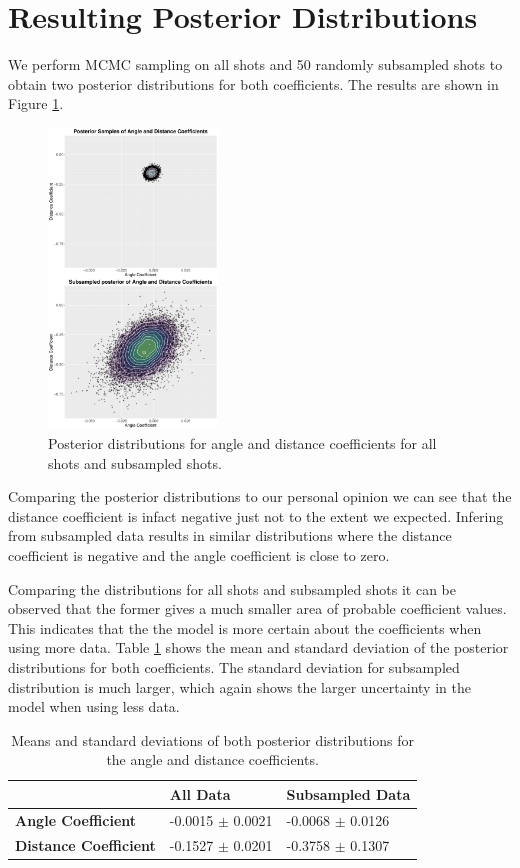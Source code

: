 \documentclass[9pt]{IEEEtran}
\begin{document}
\section{Resulting Posterior Distributions }
We perform MCMC sampling on all shots and 50 randomly subsampled shots to obtain two posterior distributions for both coefficients.
The results are shown in Figure \ref{fig:beta0}.
\begin{figure}[h]
    \centering
    \includegraphics[width=0.4\textwidth]{combined_plot_vertical.pdf}
    \caption{Posterior distributions for angle and distance coefficients for all shots and subsampled shots.}
    \label{fig:beta0}

\end{figure}
Comparing the posterior distributions to our personal opinion we can see that the distance coefficient is infact negative just not to the extent we expected.
Infering from subsampled data results in similar distributions where the distance coefficient is negative and the angle coefficient is close to zero.

Comparing the distributions for all shots and subsampled shots it can be observed that the former gives a much smaller area of probable coefficient values.
This indicates that the the model is more certain about the coefficients when using more data.
Table \ref{tab:beta0} shows the mean and standard deviation of the posterior distributions for both coefficients.
The standard deviation for subsampled distribution is much larger, which again shows the larger uncertainty in the model when using less data.
\begin{table}[!ht]
    \centering
    \begin{tabular}{lll}
        \textbf{} & \textbf{All Data} & \textbf{Subsampled Data} \\ \hline
        \textbf{Angle Coefficient} & -0.0015 $\pm$ 0.0021 & -0.0068 $\pm$ 0.0126\\ 
        \textbf{Distance Coefficient} & -0.1527 $\pm$ 0.0201 & -0.3758 $\pm$ 0.1307\\ 
    \end{tabular}
    \caption{Means and standard deviations of both posterior distributions for the angle and distance coefficients.}
    \label{tab:beta0}
\end{table}
\end{document}
